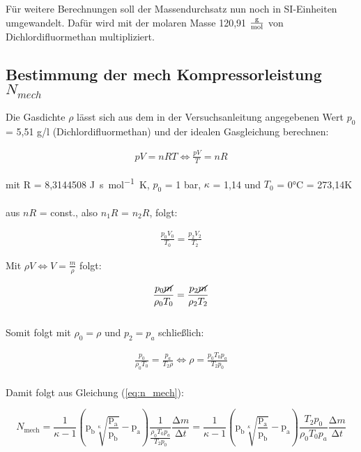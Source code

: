 {{Für weitere Berechnungen soll der Massendurchsatz nun noch in SI-Einheiten umgewandelt. Dafür wird mit der molaren Masse
120,91 $\unit[per-mode=fraction]{\gram\per\mol}$ von Dichlordifluormethan multipliziert. 


\subsection{Bestimmung der mech Kompressorleistung $N_{mech}$}

Die Gasdichte $\rho$ lässt sich aus dem in der Versuchsanleitung \cite[7]{v206} angegebenen Wert 
$p_{0}$ = 5,51 g/l (Dichlordifluormethan) und der idealen Gasgleichung berechnen:

\begin{align*}
  pV = nRT \iff \frac{pV}{T} = nR
\end{align*}

mit R = 8,3144508 \unit[per-mode=fraction]{\joule\second\per\mol\kelvin}, $p_{0}$ = 1 bar, $\kappa$ = 1,14 und
$T_{0}$ = 0\unit{\celsius} = 273,14\unit{\kelvin}\\
\\
aus $nR$ = const., also $n_{1}R$ = $n_{2}R$, folgt:

\begin{align*}
  \frac{p_{0}V_{0}}{T_{0}} = \frac{p_{2}V_{2}}{T_{2}}
\end{align*}

Mit $\rho V \iff V = \frac{m}{\rho}$ folgt:

\begin{align*}
  \frac{p_{0}\cancel{m}}{\rho_{0}T_{0}} = \frac{p_{2}\cancel{m}}{\rho_{2}T_{2}}
\end{align*} \\

Somit folgt mit $\rho_{0} = \rho$ und $p_{2} = p_{a}$ schließlich:

\begin{align}
  \frac{p_{0}}{\rho_{0}T_{0}} = \frac{p_{a}}{T_{2}\rho} \iff \rho = \frac{p_{0}T_{0}p_{a}}{T_{2}p_{0}}
\end{align}\\

Damit folgt aus Gleichung (\ref{eq:n_mech}):

\begin{equation*}
  N_\text{mech} = 
  \frac{1}{\kappa - 1} 
  \left(\text{p}_\text{b} \sqrt[\kappa]{\frac {\text{p}_\text{a}} {\text{p}_\text{b}}} - \text{p}_\text{a} \right)
  \frac{1} {\frac {\rho_{0}T_{0}p_{a}} {T_{2}p_{0}}} \frac{\increment m}{\increment t} 
  =
  \frac{1}{\kappa - 1} 
  \left(\text{p}_\text{b} \sqrt[\kappa]{\frac {\text{p}_\text{a}} {\text{p}_\text{b}}} - \text{p}_\text{a} \right)
  \frac {T_{2}p_{0}} {\rho_{0}T_{0}p_{a}} \frac{\increment m}{\increment t}
\end{equation*} \\

}}
